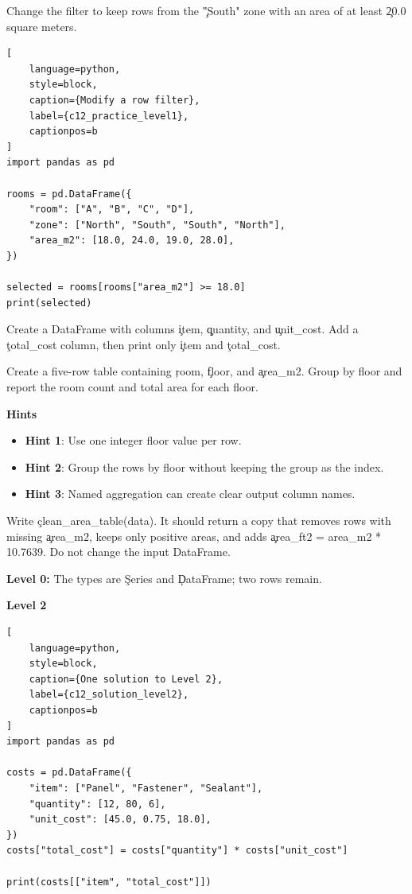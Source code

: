 
Change the filter to keep rows from the \c{"South"} zone with an area of at
least \c{20.0} square meters.

\begin{lstlisting}[
    language=python,
    style=block,
    caption={Modify a row filter},
    label={c12_practice_level1},
    captionpos=b
]
import pandas as pd

rooms = pd.DataFrame({
    "room": ["A", "B", "C", "D"],
    "zone": ["North", "South", "South", "North"],
    "area_m2": [18.0, 24.0, 19.0, 28.0],
})

selected = rooms[rooms["area_m2"] >= 18.0]
print(selected)
\end{lstlisting}


Create a DataFrame with columns \c{item}, \c{quantity}, and \c{unit_cost}.
Add a \c{total_cost} column, then print only \c{item} and \c{total_cost}.


Create a five-row table containing \c{room}, \c{floor}, and \c{area_m2}. Group
by floor and report the room count and total area for each floor.

\textbf{Hints}
\begin{itemize}
    \item \textbf{Hint 1}: Use one integer floor value per row.
    \item \textbf{Hint 2}: Group the rows by floor without keeping the group as
    the index.
    \item \textbf{Hint 3}: Named aggregation can create clear output column names.
\end{itemize}


Write \c{clean_area_table(data)}. It should return a copy that removes rows
with missing \c{area_m2}, keeps only positive areas, and adds
\c{area_ft2 = area_m2 * 10.7639}. Do not change the input DataFrame.


\textbf{Level 0:} The types are \c{Series} and \c{DataFrame}; two rows remain.

\textbf{Level 2}

\begin{lstlisting}[
    language=python,
    style=block,
    caption={One solution to Level 2},
    label={c12_solution_level2},
    captionpos=b
]
import pandas as pd

costs = pd.DataFrame({
    "item": ["Panel", "Fastener", "Sealant"],
    "quantity": [12, 80, 6],
    "unit_cost": [45.0, 0.75, 18.0],
})
costs["total_cost"] = costs["quantity"] * costs["unit_cost"]

print(costs[["item", "total_cost"]])
\end{lstlisting}

